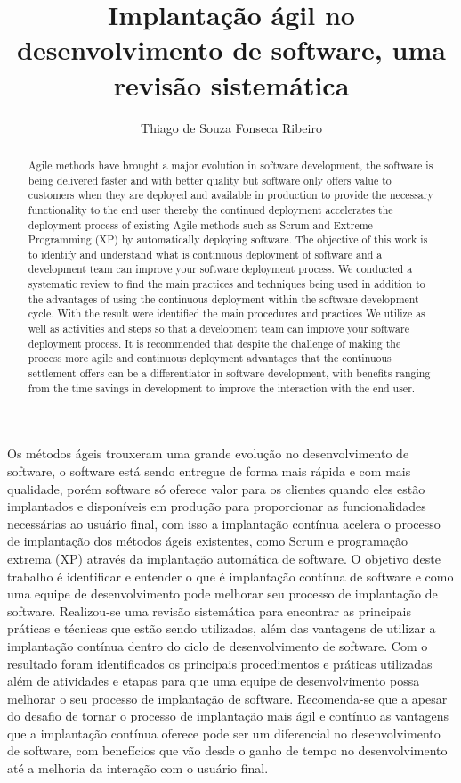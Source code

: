 \documentclass[12pt]{article}
\title{Implantação ágil no desenvolvimento de software, uma revisão sistemática}
\author{Thiago  de Souza Fonseca Ribeiro\inst{1}}
\begin{document}
 

\maketitle

\begin{abstract}
Agile methods have brought a major evolution in software development, the software is being delivered faster and with better quality but software only offers value to customers when they are deployed and available in production to provide the necessary functionality to the end user thereby the continued deployment accelerates the deployment process of existing Agile methods such as Scrum and Extreme Programming (XP) by automatically deploying software. The objective of this work is to identify and understand what is continuous deployment of software and a development team can improve your software deployment process. We conducted a systematic review to find the main practices and techniques being used in addition to the advantages of using the continuous deployment within the software development cycle. With the result were identified the main procedures and practices We utilize as well as activities and steps so that a development team can improve your software deployment process. It is recommended that despite the challenge of making the process more agile and continuous deployment advantages that the continuous settlement offers can be a differentiator in software development, with benefits ranging from the time savings in development to improve the interaction with the end user.
\end{abstract}
     
\begin{resumo} 

Os métodos ágeis trouxeram uma grande evolução no desenvolvimento de software, o software está sendo entregue de forma mais rápida e com mais qualidade, porém software só oferece valor para os clientes quando eles estão implantados e disponíveis em produção para proporcionar as funcionalidades necessárias ao usuário final, com isso a implantação contínua acelera o processo de implantação dos métodos ágeis existentes, como Scrum e programação extrema (XP) através da implantação automática de software. O objetivo deste trabalho é identificar e entender o que é implantação contínua de software e como uma equipe de desenvolvimento pode melhorar seu processo de implantação de software. Realizou-se uma revisão sistemática para encontrar as principais práticas e técnicas que estão sendo utilizadas, além das vantagens de utilizar a implantação contínua dentro do ciclo de desenvolvimento de software. Com o resultado foram identificados os principais procedimentos e práticas utilizadas além de atividades e etapas para que uma equipe de desenvolvimento possa melhorar o seu processo de implantação de software. Recomenda-se que a apesar do desafio de tornar o processo de implantação mais ágil e contínuo as vantagens que a implantação contínua oferece pode ser um diferencial no desenvolvimento de software, com benefícios que vão desde o ganho de tempo no desenvolvimento até a melhoria da interação com o usuário final.
\end{resumo}
\end{document}
